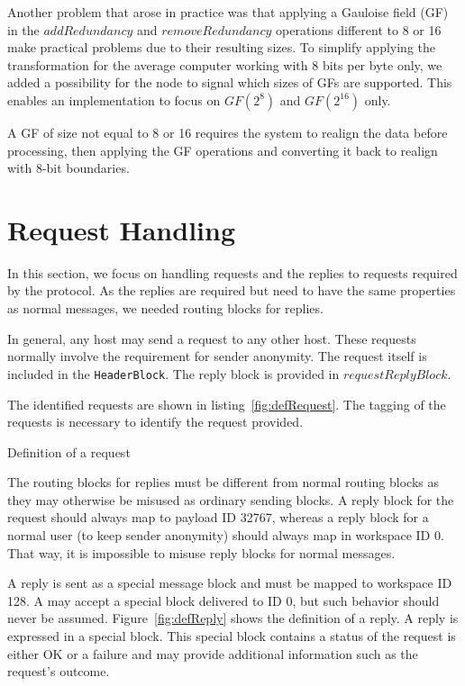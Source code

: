 Another problem that arose in practice was that applying a Gauloise field (GF) in the $addRedundancy$ and $removeRedundancy$ operations different to 8 or 16 make practical problems due to their resulting sizes. To simplify applying the transformation for the average computer working with 8 bits per byte only, we added a possibility for the node to signal which sizes of GFs are supported. This enables an implementation to focus on $GF(2^8)$ and $GF(2^{16})$ only.

A GF of size not equal to 8 or 16 requires the system to realign the data before processing, then applying the GF operations and converting it back to realign with 8-bit boundaries.

\section{Request Handling}
In this section, we focus on handling requests and the replies to requests required by the protocol. As the replies are required but need to have the same properties as normal messages, we needed routing blocks for replies.

In general, any host may send a request to any other host. These requests normally involve the requirement for sender anonymity. The request itself is included in the \lstinline[columns=fixed,basicstyle=\normalsize]{HeaderBlock}. The reply block is provided in $requestReplyBlock$.

The identified requests are shown in listing~\ref{fig:defRequest}. The tagging of the requests is necessary to identify the request provided.

\begin{lstfloat}[ht]
	
	\caption{Definition of a request}
	\label{fig:defRequest}
\end{lstfloat}

The routing blocks for replies must be different from normal routing blocks as they may otherwise be misused as ordinary sending blocks. A reply block for the request should always map to payload ID 32767, whereas a reply block for a normal user (to keep sender anonymity) should always map in workspace ID 0. That way, it is impossible to misuse reply blocks for normal messages.

A reply is sent as a special message block and must be mapped to workspace ID 128. A \VortexNode{} may accept a special block delivered to ID 0, but such behavior should never be assumed. Figure~\ref{fig:defReply} shows the definition of a reply. A reply is expressed in a special block. This special block contains a status of the request is either OK or a failure and may provide additional information such as the request's outcome.

